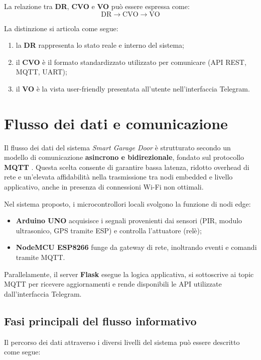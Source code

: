 La relazione tra \textbf{DR}, \textbf{CVO} e \textbf{VO} può essere espressa come:
\[
\text{DR} \longrightarrow \text{CVO} \longrightarrow \text{VO}
\]

La distinzione si articola come segue:
\begin{enumerate}
    \item la \textbf{DR} rappresenta lo stato reale e interno del sistema;
    \item il \textbf{CVO} è il formato standardizzato utilizzato per comunicare (API REST, MQTT, UART);
    \item il \textbf{VO} è la vista user-friendly presentata all’utente nell’interfaccia Telegram.
\end{enumerate}



\section{Flusso dei dati e comunicazione}

Il flusso dei dati del sistema \textit{Smart Garage Door} è strutturato secondo un modello di comunicazione \textbf{asincrono e bidirezionale}, fondato sul protocollo \textbf{MQTT} \cite{MQTTspec}.
Questa scelta consente di garantire bassa latenza, ridotto overhead di rete e un’elevata affidabilità nella trasmissione tra nodi embedded e livello applicativo, anche in presenza di connessioni Wi-Fi non ottimali.

Nel sistema proposto, i microcontrollori locali svolgono la funzione di nodi edge:
\begin{itemize}
\item \textbf{Arduino UNO} acquisisce i segnali provenienti dai sensori (PIR, modulo ultrasonico, GPS tramite ESP) e controlla l’attuatore (relè);
\item \textbf{NodeMCU ESP8266} funge da gateway di rete, inoltrando eventi e comandi tramite MQTT.
\end{itemize}

Parallelamente, il server \textbf{Flask} esegue la logica applicativa, si sottoscrive ai topic MQTT per ricevere aggiornamenti e rende disponibili le API utilizzate dall’interfaccia Telegram.

\subsection*{Fasi principali del flusso informativo}

Il percorso dei dati attraverso i diversi livelli del sistema può essere descritto come segue:

